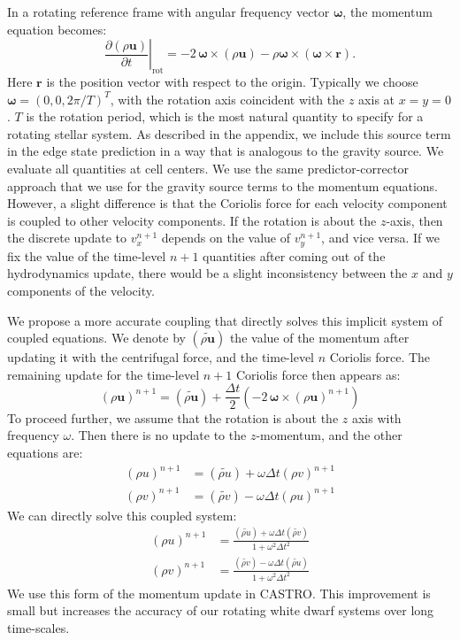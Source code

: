 \documentclass[iop]{../emulateapj}
\begin{document}
In a rotating reference frame with angular frequency vector $\bm{\omega}$, the momentum equation becomes:
\begin{equation}
  \left.\frac{\partial(\rho \mathbf{u})}{\partial t}\right|_{\text{rot}} = -2\, {\bm\omega} \times (\rho\mathbf{u}) - \rho {\bm\omega} \times \left({\bm\omega} \times \mathbf{r}\right).
\end{equation}
Here $\mathbf{r}$ is the position vector with respect to the origin. Typically we choose $\bm{\omega} = (0, 0, 2\pi / T)^T$,
with the rotation axis coincident with the $z$ axis at $x = y = 0$.
$T$ is the rotation period, which is the most natural quantity to specify
for a rotating stellar system. As described in the appendix, we include this source term
in the edge state prediction in a way that is analogous to the gravity source.
We evaluate all quantities at cell centers. We use the same predictor-corrector 
approach that we use for the gravity source terms to the momentum equations. However, a slight 
difference is that the Coriolis force for each velocity component is coupled to other velocity 
components. If the rotation is about the $z$-axis, then the discrete update to 
$v_x^{n+1}$ depends on the value of $v_y^{n+1}$, and vice versa. If we fix the value of 
the time-level $n+1$ quantities after coming out of the hydrodynamics update, there 
would be a slight inconsistency between the $x$ and $y$ components of the velocity. 

We propose a more accurate coupling that directly solves this implicit system of coupled 
equations. We denote by $(\widetilde{\rho \mathbf{u}})$ the value of the momentum after 
updating it with the centrifugal force, and the time-level $n$ Coriolis force. The remaining 
update for the time-level $n+1$ Coriolis force then appears as:
\begin{equation}
  (\rho \mathbf{u})^{n+1} = (\widetilde{\rho\mathbf{u}}) + \frac{\Delta t}{2} \left(-2\, {\bm\omega} \times (\rho\mathbf{u})^{n+1}\right)
\end{equation}
To proceed further, we assume that the rotation is about the $z$ axis with frequency $\omega$. 
Then there is no update to the $z$-momentum, and the other equations are:
\begin{align}
  (\rho u)^{n+1} &= (\widetilde{\rho u}) + \omega \Delta t (\rho v)^{n+1} \\
  (\rho v)^{n+1} &= (\widetilde{\rho v}) - \omega \Delta t (\rho u)^{n+1}
\end{align} 
We can directly solve this coupled system:
\begin{align}
  (\rho u)^{n+1} &= \frac{ (\widetilde{\rho u}) + \omega \Delta t (\widetilde{\rho v})}{1 + \omega^2 \Delta t^2} \\
  (\rho v)^{n+1} &= \frac{ (\widetilde{\rho v}) - \omega \Delta t (\widetilde{\rho u})}{1 + \omega^2 \Delta t^2}
\end{align}
We use this form of the momentum update in CASTRO. This improvement is small
but increases the accuracy of our rotating white dwarf systems over long time-scales.
\end{document}
